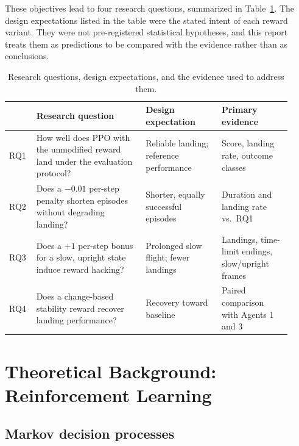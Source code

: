 \documentclass[11pt,a4paper]{article}
\begin{document}
These objectives lead to four research questions, summarized in Table~\ref{tab:rq}. The design expectations listed in the table were the stated intent of each reward variant. They were not pre-registered statistical hypotheses, and this report treats them as predictions to be compared with the evidence rather than as conclusions.

\begin{table}[!htb]
\caption[Research questions and evidence]{Research questions, design expectations, and the evidence used to address them.}\label{tab:rq}
\centering\small
\begin{tabular}{@{}p{0.08\linewidth}p{0.36\linewidth}p{0.25\linewidth}p{0.23\linewidth}@{}}
\toprule
 & Research question & Design expectation & Primary evidence \\
\midrule
RQ1 & How well does PPO with the unmodified reward land under the evaluation protocol? & Reliable landing; reference performance & Score, landing rate, outcome classes \\
RQ2 & Does a $-0.01$ per-step penalty shorten episodes without degrading landing? & Shorter, equally successful episodes & Duration and landing rate vs.\ RQ1 \\
RQ3 & Does a $+1$ per-step bonus for a slow, upright state induce reward hacking? & Prolonged slow flight; fewer landings & Landings, time-limit endings, slow/upright frames \\
RQ4 & Does a change-based stability reward recover landing performance? & Recovery toward baseline & Paired comparison with Agents 1 and 3 \\
\bottomrule
\end{tabular}
\end{table}

\section{Theoretical Background: Reinforcement Learning}\label{sec:rl}

\subsection{Markov decision processes}
\end{document}
